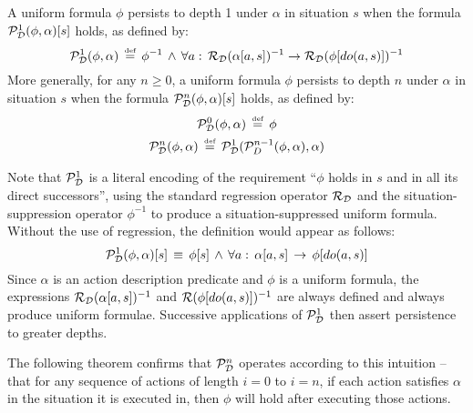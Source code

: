 \begin{defnL}
 A uniform formula $\phi$ persists
to depth 1 under $\alpha$ in situation $s$ when the formula $\mathcal{P}_{\mathcal{D}}^{1}(\phi,\alpha)[s]$
holds, as defined by:\label{def:persists-depth-n}\[
\mathcal{P}_{\mathcal{D}}^{1}(\phi,\alpha)\,\stackrel{\mbox{\tiny def}}{=}\,\phi^{-1}\,\wedge\,\forall a:\,\mathcal{R}_{\mathcal{D}}(\alpha[a,s])^{-1}\rightarrow\mathcal{R}_{\mathcal{D}}(\phi[do(a,s)])^{-1}\]
 More generally, for any $n\geq0$, a uniform formula $\phi$ persists
to depth $n$ under $\alpha$ in situation $s$ when the formula $\mathcal{P}_{\mathcal{D}}^{n}(\phi,\alpha)[s]$
holds, as defined by:\begin{gather*}
\mathcal{P}_{\mathcal{D}}^{0}(\phi,\alpha)\,\stackrel{\mbox{\tiny def}}{=}\,\phi\\
\mathcal{P}_{\mathcal{D}}^{n}(\phi,\alpha)\,\stackrel{\mbox{\tiny def}}{=}\,\mathcal{P}_{\mathcal{D}}^{1}(\mathcal{P}_{D}^{n-1}(\phi,\alpha),\alpha)\end{gather*}

\end{defnL}
Note that $\mathcal{P}_{\mathcal{D}}^{1}$ is a literal encoding of the requirement
{}``$\phi$ holds in $s$ and in all its direct successors'', using
the standard regression operator $\mathcal{R}_{\mathcal{D}}$ and the situation-suppression
operator $\phi^{-1}$ to produce a situation-suppressed uniform formula.
Without the use of regression, the definition would appear as follows:\[
\mathcal{P}^{1}_{\mathcal{D}}(\phi,\alpha)[s]\,\equiv\,\phi[s]\,\wedge\,\forall a:\,\alpha[a,s]\,\rightarrow\,\phi[do(a,s)]\]
Since $\alpha$ is an action description predicate and $\phi$ is
a uniform formula, the expressions $\mathcal{R}_{\mathcal{D}}(\alpha[a,s])^{-1}$
and $\mathcal{R}(\phi[do(a,s)])^{-1}$ are always defined and always produce
uniform formulae. Successive applications of $\mathcal{P}_{\mathcal{D}}^{1}$ then
assert persistence to greater depths.

The following theorem confirms that $\mathcal{P}_{\mathcal{D}}^{n}$ operates according
to this intuition -- that for any sequence of actions of length $i=0$
to $i=n$, if each action satisfies $\alpha$ in the situation it
is executed in, then $\phi$ will hold after executing those actions.

